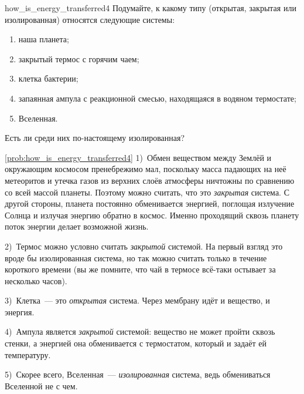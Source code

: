 \begin{problem}{}{how_is_energy_transferred4}
    Подумайте, к какому типу (открытая, закрытая или изолированная) относятся следующие системы:

    \begin{enumerate}[label=\arabic*)]
        \item наша планета;
        \item закрытый термос с горячим чаем;
        \item клетка бактерии;
        \item запаянная ампула с реакционной смесью, находящаяся в водяном термостате;
        \item Вселенная.
    \end{enumerate}

    Есть ли среди них по-настоящему изолированная?
    \begin{sol}{\ref{prob:how_is_energy_transferred4}}
        1)~Обмен веществом между Землёй и окружающим космосом пренебрежимо мал, поскольку масса падающих на неё метеоритов и утечка газов из верхних слоёв атмосферы ничтожны по сравнению со всей массой планеты. Поэтому можно считать, что это \emph{закрытая} система. С другой стороны, планета постоянно обменивается энергией, поглощая излучение Солнца и излучая энергию обратно в космос. Именно проходящий сквозь планету поток энергии делает возможной жизнь.

        2)~Термос можно условно считать \emph{закрытой} системой. На первый взгляд это вроде бы изолированная система, но так можно считать только в течение короткого времени (вы же помните, что чай в термосе всё-таки остывает за несколько часов).

        3)~Клетка~--- это \emph{открытая} система. Через мембрану идёт и вещество, и энергия.

        4)~Ампула является \emph{закрытой} системой: вещество не может пройти сквозь стенки, а энергией она обменивается с термостатом, который и задаёт ей температуру.

        5)~Скорее всего, Вселенная~--- \emph{изолированная} система, ведь обмениваться Вселенной не с чем.
    \end{sol}
\end{problem}

